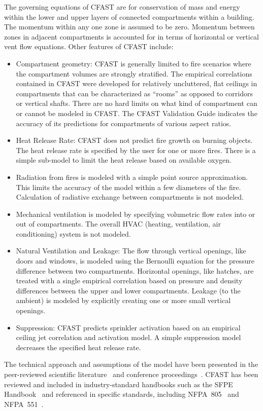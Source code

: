 The governing equations of CFAST are for conservation of mass and energy within the lower and upper layers of connected compartments within a building. The momentum within any one zone is assumed to be zero.  Momentum between zones in adjacent compartments is accounted for in terms of horizontal or vertical vent flow equations. Other features of CFAST include:
\begin{itemize}
\item Compartment geometry: CFAST is generally limited to fire scenarios where the compartment volumes are strongly stratified. The empirical correlations contained in CFAST were developed for relatively uncluttered, flat ceilings in compartments that can be characterized as ``rooms'' as opposed to corridors or vertical shafts. There are no hard limits on what kind of compartment can or cannot be modeled in CFAST. The CFAST Validation Guide indicates the accuracy of its predictions for compartments of various aspect ratios.
\item Heat Release Rate: CFAST does not predict fire growth on burning objects. The heat release rate is specified by the user for one or more fires. There is a simple sub-model to limit the heat release based on available oxygen.
\item Radiation from fires is modeled with a simple point source approximation.  This limits the accuracy of the model within a few diameters of the fire. Calculation of radiative exchange between compartments is not modeled.
\item Mechanical ventilation is modeled by specifying volumetric flow rates into or out of compartments. The overall HVAC (heating, ventilation, air conditioning) system is not modeled.
\item Natural Ventilation and Leakage: The flow through vertical openings, like doors and windows, is modeled using the Bernoulli equation for the pressure difference between two compartments. Horizontal openings, like hatches, are treated with a single empirical correlation based on pressure and density differences between the upper and lower compartments. Leakage (to the ambient) is modeled by explicitly creating one or more small vertical openings.
\item Suppression: CFAST predicts sprinkler activation based on an empirical ceiling jet correlation and activation model. A simple suppression model decreases the specified heat release rate.
\end{itemize}
The technical approach and assumptions of the model have been presented in the peer-reviewed scientific literature~\cite{Jones:1993a, Jones:1985, Jones:1984} and conference proceedings~\cite{Jones:1991}. CFAST has been reviewed and included in industry-standard handbooks such as the SFPE Handbook~\cite{Walton:2003} and referenced in specific standards, including NFPA~805~\cite{NFPA805:2004} and NFPA~551~\cite{NFPA551:2004}.

